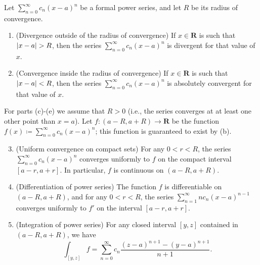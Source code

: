 \setcounter{theorem}{5}
\begin{theorem}\label{4.1.6}
    Let \(\sum_{n = 0}^\infty c_n (x - a)^n\) be a formal power series, and let \(R\) be its radius of convergence.
    \begin{enumerate}
        \item (Divergence outside of the radius of convergence)
              If \(x \in \mathbf{R}\) is such that \(\abs*{x - a} > R\), then the series \(\sum_{n = 0}^\infty c_n (x - a)^n\) is divergent for that value of \(x\).
        \item (Convergence inside the radius of convergence)
              If \(x \in \mathbf{R}\) is such that \(\abs*{x - a} < R\), then the series \(\sum_{n = 0}^\infty c_n (x - a)^n\) is absolutely convergent for that value of \(x\).
    \end{enumerate}
    For parts (c)-(e) we assume that \(R > 0\)
    (i.e., the series converges at at least one other point than \(x = a\)).
    Let \(f : (a - R, a + R) \to \mathbf{R}\) be the function \(f(x) \coloneqq \sum_{n = 0}^\infty c_n (x - a)^n\);
    this function is guaranteed to exist by (b).
    \begin{enumerate}
        \setcounter{enumi}{2}
        \item (Uniform convergence on compact sets)
              For any \(0 < r < R\), the series \(\sum_{n = 0}^\infty c_n (x - a)^n\) converges uniformly to \(f\) on the compact interval \([a - r, a + r]\).
              In particular, \(f\) is continuous on \((a - R, a + R)\).
        \item (Differentiation of power series)
              The function \(f\) is differentiable on \((a - R, a + R)\), and for any \(0 < r < R\), the series \(\sum_{n = 1}^\infty n c_n (x - a)^{n - 1}\) converges uniformly to \(f'\) on the interval \([a - r, a + r]\).
        \item (Integration of power series)
              For any closed interval \([y, z]\) contained in \((a - R, a + R)\), we have
              \[
                  \int_{[y, z]} f = \sum_{n = 0}^\infty c_n \frac{(z - a)^{n + 1} - (y - a)^{n + 1}}{n + 1}.
              \]
    \end{enumerate}
\end{theorem}


